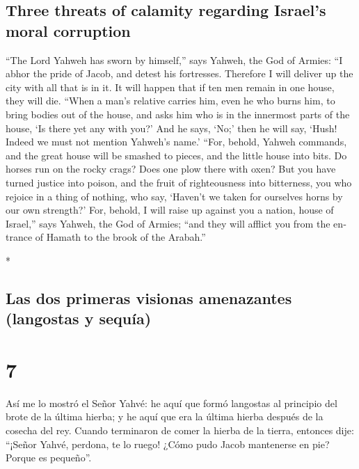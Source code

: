 \begin{paracol}{2}
\begin{otherlanguage}{english}
\hypertarget{three-threats-of-calamity-regarding-israels-moral-corruption}{%
\subsection{Three threats of calamity regarding Israel's moral
corruption}\label{three-threats-of-calamity-regarding-israels-moral-corruption}}

 ``The Lord Yahweh has sworn by himself,'' says Yahweh,
the God of Armies: ``I abhor the pride of Jacob, and detest his
fortresses. Therefore I will deliver up the city with all that is in it.
 It will happen that if ten men remain in one house, they
will die.  ``When a man's relative carries him, even he
who burns him, to bring bodies out of the house, and asks him who is in
the innermost parts of the house, `Is there yet any with you?' And he
says, `No;' then he will say, `Hush! Indeed we must not mention Yahweh's
name.'  ``For, behold, Yahweh commands, and the great
house will be smashed to pieces, and the little house into bits.
 Do horses run on the rocky crags? Does one plow there
with oxen? But you have turned justice into poison, and the fruit of
righteousness into bitterness,  you who rejoice in a
thing of nothing, who say, `Haven't we taken for ourselves horns by our
own strength?'  For, behold, I will raise up against you
a nation, house of Israel,'' says Yahweh, the God of Armies; ``and they
will afflict you from the entrance of Hamath to the brook of the
Arabah.''

\end{otherlanguage}

\switchcolumn[0]*

\hypertarget{las-dos-primeras-visionas-amenazantes-langostas-y-sequuxeda}{%
\subsection{Las dos primeras visionas amenazantes (langostas y
sequía)}\label{las-dos-primeras-visionas-amenazantes-langostas-y-sequuxeda}}

\hypertarget{section-12}{%
\section{7}\label{section-12}}

 Así me lo mostró el Señor Yahvé: he aquí que formó
langostas al principio del brote de la última hierba; y he aquí que era
la última hierba después de la cosecha del rey.  Cuando
terminaron de comer la hierba de la tierra, entonces dije: ``¡Señor
Yahvé, perdona, te lo ruego! ¿Cómo pudo Jacob mantenerse en pie? Porque
es pequeño''.


\end{paracol}
